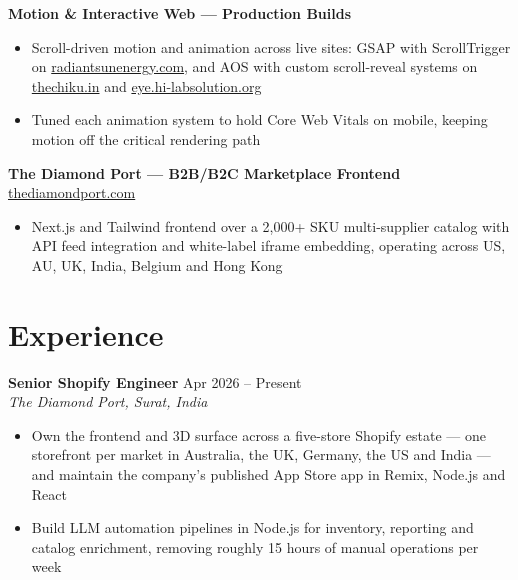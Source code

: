 \documentclass[10pt]{article}
\begin{document}
\vspace{1pt}

\textbf{Motion \& Interactive Web --- Production Builds}
\begin{itemize}
  \item Scroll-driven motion and animation across live sites: GSAP with ScrollTrigger on \href{https://www.radiantsunenergy.com}{radiantsunenergy.com}, and AOS with custom scroll-reveal systems on \href{https://thechiku.in}{thechiku.in} and \href{https://eye.hi-labsolution.org}{eye.hi-labsolution.org}
  \item Tuned each animation system to hold Core Web Vitals on mobile, keeping motion off the critical rendering path
\end{itemize}

\vspace{1pt}

\textbf{The Diamond Port --- B2B/B2C Marketplace Frontend} \hfill \href{https://thediamondport.com}{thediamondport.com}
\begin{itemize}
  \item Next.js and Tailwind frontend over a 2,000+ SKU multi-supplier catalog with API feed integration and white-label iframe embedding, operating across US, AU, UK, India, Belgium and Hong Kong
\end{itemize}

\section*{Experience}

\textbf{Senior Shopify Engineer} \hfill Apr 2026 -- Present \\
\textit{The Diamond Port, Surat, India}
\begin{itemize}
  \item Own the frontend and 3D surface across a five-store Shopify estate --- one storefront per market in Australia, the UK, Germany, the US and India --- and maintain the company's published App Store app in Remix, Node.js and React
  \item Build LLM automation pipelines in Node.js for inventory, reporting and catalog enrichment, removing roughly 15 hours of manual operations per week
\end{itemize}

\vspace{1pt}
\end{document}

